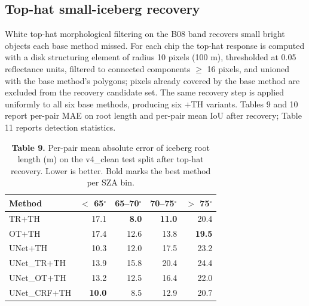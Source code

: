 \documentclass[review,jog]{igs}
\begin{document}
\subsection{Top-hat small-iceberg recovery}

White top-hat morphological filtering on the B08 band recovers small bright objects each base method missed. For each chip the top-hat response is computed with a disk structuring element of radius 10 pixels (100 m), thresholded at 0.05 reflectance units, filtered to connected components $\geq$ 16 pixels, and unioned with the base method's polygons; pixels already covered by the base method are excluded from the recovery candidate set. The same recovery step is applied uniformly to all six base methods, producing six $+$TH variants. Tables 9 and 10 report per-pair MAE on root length and per-pair mean IoU after recovery; Table 11 reports detection statistics.

\begin{table}[h]
\caption{\textbf{Table 9.} Per-pair mean absolute error of iceberg root length (m) on the v4\_clean test split after top-hat recovery. Lower is better. Bold marks the best method per SZA bin.}
\centering
\begin{tabular}{lrrrr}
\toprule
Method & $<$ 65$^\circ$ & 65--70$^\circ$ & 70--75$^\circ$ & $>$ 75$^\circ$ \\
\midrule
TR$+$TH        & 17.1           & \textbf{8.0}   & \textbf{11.0}  & 20.4 \\
OT$+$TH        & 17.4           & 12.6           & 13.8           & \textbf{19.5} \\
UNet$+$TH      & 10.3           & 12.0           & 17.5           & 23.2 \\
UNet\_TR$+$TH  & 13.9           & 15.8           & 20.4           & 24.4 \\
UNet\_OT$+$TH  & 13.2           & 12.5           & 16.4           & 22.0 \\
UNet\_CRF$+$TH & \textbf{10.0}  & 8.5            & 12.9           & 20.7 \\
\bottomrule
\end{tabular}
\end{table}
\end{document}
